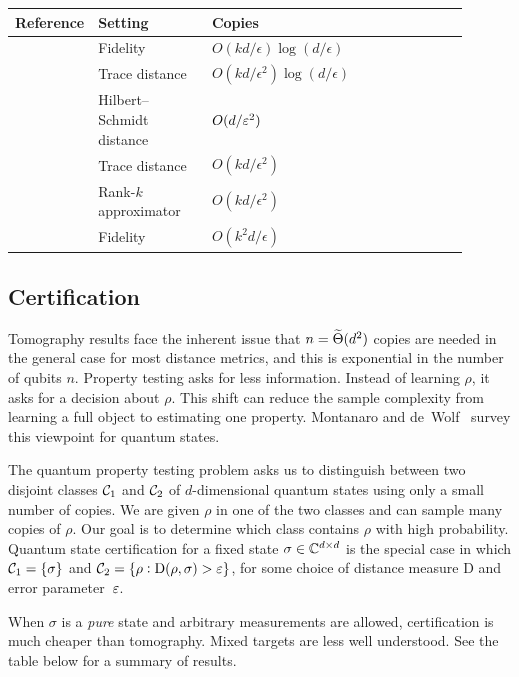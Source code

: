 \begin{table}[H]
\centering
\small
\begin{tabular}{p{0.16\linewidth}p{0.26\linewidth}p{0.20\linewidth}p{0.28\linewidth}}
\toprule
Reference & Setting & Copies \\
\midrule
\cite{haah2016sample} & Fidelity & $O(kd/\epsilon)\log(d/\epsilon)$ \\
  \cite{haah2016sample} & Trace distance & $O(kd/\epsilon^2)\log(d/\epsilon)$ \\
\cite{swan1swan2_2016efficient} & Hilbert--Schmidt distance & $O(d/\varepsilon^2)$ \\
\cite{swan1swan2_2016efficient} & Trace distance & $O(kd/\epsilon^2)$ \\
\cite{swan1swan2_2016efficient} & Rank-$k$ approximator & $O(kd/\epsilon^2)$ \\
\cite{swan1swan2_2017efficient} & Fidelity & $O(k^2d/\epsilon)$ \\
\bottomrule
\end{tabular}
\end{table}

\subsection{Certification}

Tomography results face the inherent issue that $n = \widetilde{\Theta}(d^2)$ copies are needed in the general case for most distance metrics, and this is exponential in the number of qubits $n$. Property testing asks for less information. Instead of learning $\rho$, it asks for a decision about $\rho$. This shift can reduce the sample complexity from learning a full object to estimating one property. Montanaro and de~Wolf~\cite{montanaro2013survey} survey this viewpoint for quantum states.

The quantum property testing problem asks us to distinguish between two disjoint classes $\mathcal{C}_1$ and $\mathcal{C}_2$ of $d$-dimensional quantum states using only a small number of copies. We are given $\rho$ in one of the two classes and can sample many copies of $\rho$. Our goal is to determine which class contains $\rho$ with high probability. Quantum state certification for a fixed state $\sigma \in \mathbb{C}^{d \times d}$ is the special case in which $\mathcal{C}_1 = \{\sigma\}$ and $\mathcal{C}_2 = \{\rho : \mathrm{D}(\rho,\sigma) > \varepsilon\}$, for some choice of distance measure $\mathrm{D}$ and error parameter~$\varepsilon$.

When $\sigma$ is a \emph{pure} state and arbitrary measurements are allowed, certification is much cheaper than tomography. Mixed targets are less well understood. See the table below for a summary of results.

